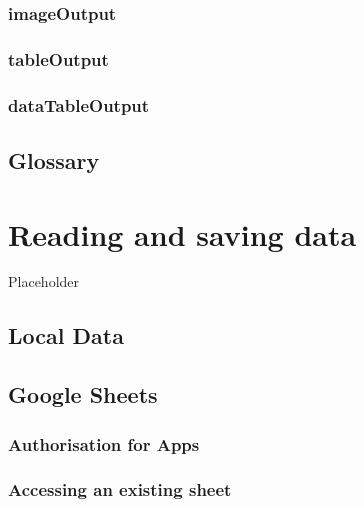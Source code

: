 \documentclass[
]{book}
\begin{document}
\hypertarget{imageoutput}{%
\subsection{imageOutput}\label{imageoutput}}

\hypertarget{tableoutput}{%
\subsection{tableOutput}\label{tableoutput}}

\hypertarget{datatableoutput}{%
\subsection{dataTableOutput}\label{datatableoutput}}

\hypertarget{glossary-outputs}{%
\section{Glossary}\label{glossary-outputs}}

\hypertarget{data}{%
\chapter{Reading and saving data}\label{data}}

Placeholder

\hypertarget{local-data}{%
\section{Local Data}\label{local-data}}

\hypertarget{google_sheets}{%
\section{Google Sheets}\label{google_sheets}}

\hypertarget{authorisation-for-apps}{%
\subsection{Authorisation for Apps}\label{authorisation-for-apps}}

\hypertarget{accessing-an-existing-sheet}{%
\subsection{Accessing an existing sheet}\label{accessing-an-existing-sheet}}
\end{document}
